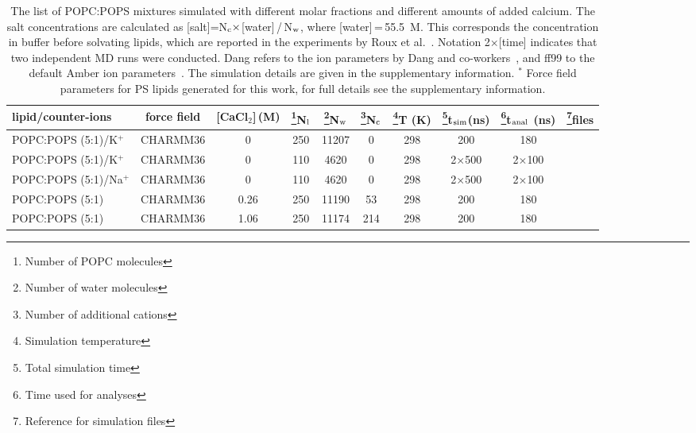 \documentclass[aps,prl,superscriptaddress,twocolumn]{revtex4}
\begin{document}
\begin{table}[tb]
\centering
\caption{The list of POPC:POPS mixtures simulated with different molar fractions and different amounts of added calcium. 
  The salt concentrations are calculated as [salt]=N$_{\rm c} \times$[water]\,/\,N$_{\rm w}$, where [water]\,=\,55.5~M.
  This corresponds the concentration in buffer before solvating lipids, which are
  reported in the experiments by Roux et al.~\cite{roux90}.
  Notation 2$\times$[time] indicates that two independent MD runs were conducted.
  Dang refers to the ion parameters by Dang and co-workers~\cite{smith94,dang06}, and ff99 to the default Amber ion parameters~\cite{aqvist90}.
  The simulation details are given in the supplementary information.
  $^*$ Force field parameters for PS lipids generated for this work, for full details see the supplementary information.
}\label{mixedIONsystems}
\begin{tabular}{lccccccccc}
lipid/counter-ions  & force field & {[}CaCl$_{2}${]}\,(M)  & \footnote{Number of POPC molecules}N$_{{\rm l}}$  & \footnote{Number of water molecules}N$_{{\rm w}}$  & \footnote{Number of additional cations}N$_{{\rm c}}$  & \footnote{Simulation temperature}T (K)  & \footnote{Total simulation time}t$_{{\rm sim}}$(ns)  & \footnote{Time used for analyses}t$_{{\rm anal}}$ (ns)  & \footnote{Reference for simulation files}files\tabularnewline
\hline 
POPC:POPS (5:1)/K$^{+}$  & CHARMM36 \cite{klauda10,venable13}  & 0  & 250  & 11207  & 0  & 298  & 200  & 180  & \cite{POPC5POPS1noCaClCHARMM} \tabularnewline
POPC:POPS (5:1)/K$^{+}$  & CHARMM36 \cite{klauda10,venable13}  & 0  & 110  & 4620  & 0  & 298  & 2$\times$500  & 2$\times$100  & \cite{charmm36pops+83popcT298Kpiggot} \tabularnewline
POPC:POPS (5:1)/Na$^{+}$  & CHARMM36 \cite{klauda10,venable13}  & 0  & 110 & 4620  & 0  & 298  & 2$\times$500  & 2$\times$100  & \cite{charmm36pops+83popcT298KpiggotSODIUM} \tabularnewline
POPC:POPS (5:1)  & CHARMM36 \cite{klauda10,venable13,kim16}  & 0.26  & 250 & 11190  & 53  & 298  & 200  & 180  & \cite{POPC5POPS1withCaClCHARMM} \tabularnewline
POPC:POPS (5:1)  & CHARMM36 \cite{klauda10,venable13,kim16}  & 1.06  & 250 & 11174  & 214  & 298  & 200  & 180  & \cite{POPC5POPS1with1MCaClCHARMM} \tabularnewline

\end{tabular}
\end{table}
\end{document}
